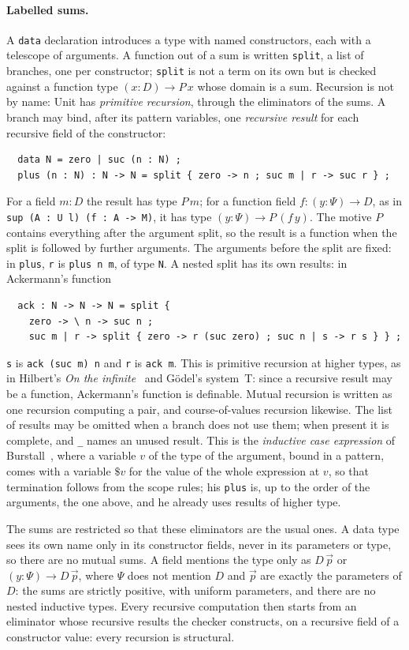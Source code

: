 \documentclass[11pt]{article}
\newcommand{\sys}{\textsf{Unit}\xspace}
\newcommand{\kw}[1]{\texttt{#1}}
\theoremstyle{remark}
\begin{document}
\paragraph{Labelled sums.} A \kw{data} declaration introduces a type with
named constructors, each with a telescope of arguments. A function out of
a sum is written \kw{split}, a list of branches, one per constructor;
\kw{split} is not a term on its own but is checked against a function
type $(x:D)\to P\,x$ whose domain is a sum. Recursion is not by name:
\sys has \emph{primitive recursion}, through the eliminators of the sums.
A branch may bind, after its pattern variables, one \emph{recursive
result} for each recursive field of the constructor:
\begin{verbatim}
  data N = zero | suc (n : N) ;
  plus (n : N) : N -> N = split { zero -> n ; suc m | r -> suc r } ;
\end{verbatim}
For a field $m : D$ the result has type $P\,m$; for a function field
$f : (y:\Psi)\to D$, as in \kw{sup (A : U l) (f : A -> M)}, it has type
$(y:\Psi)\to P\,(f\,y)$. The motive $P$ contains everything after the
argument split, so the result is a function when the split is followed by
further arguments. The arguments before the split are fixed: in
\kw{plus}, \kw{r} is \kw{plus n m}, of type \kw{N}. A nested split has its own results: in Ackermann's function
\begin{verbatim}
  ack : N -> N -> N = split {
    zero -> \ n -> suc n ;
    suc m | r -> split { zero -> r (suc zero) ; suc n | s -> r s } } ;
\end{verbatim}
\kw{s} is \kw{ack (suc m) n} and \kw{r} is \kw{ack m}. This is primitive
recursion at higher types, as in Hilbert's \emph{On the infinite}~\cite{Hilbert}
and G\"odel's system~T: since a recursive
result may be a function, Ackermann's function is definable. Mutual recursion
is written as one recursion computing a pair, and course-of-values
recursion likewise. The list of results may be omitted when a branch does
not use them; when present it is complete, and \kw{\_} names an unused
result.
This is the \emph{inductive case expression} of
Burstall~\cite{Burstall}, where a variable $v$ of the type of the
argument, bound in a pattern, comes with a variable $\$v$ for the value of
the whole expression at $v$, so that termination follows from the scope
rules; his \kw{plus} is, up to the order of the arguments, the one
above, and he already uses results of
higher type.

The sums are restricted so that these eliminators are the usual ones. A
data type sees its own name only in its constructor fields, never in its
parameters or type, so there are no mutual sums. A field mentions the
type only as $D\,\vec p$ or $(y:\Psi)\to D\,\vec p$, where $\Psi$ does not
mention $D$ and $\vec p$ are exactly the parameters of $D$: the sums are
strictly positive, with uniform parameters, and there are no nested
inductive types. Every recursive computation then starts from
an eliminator whose recursive results the checker constructs, on a
recursive field of a constructor value: every recursion is structural.
\end{document}
